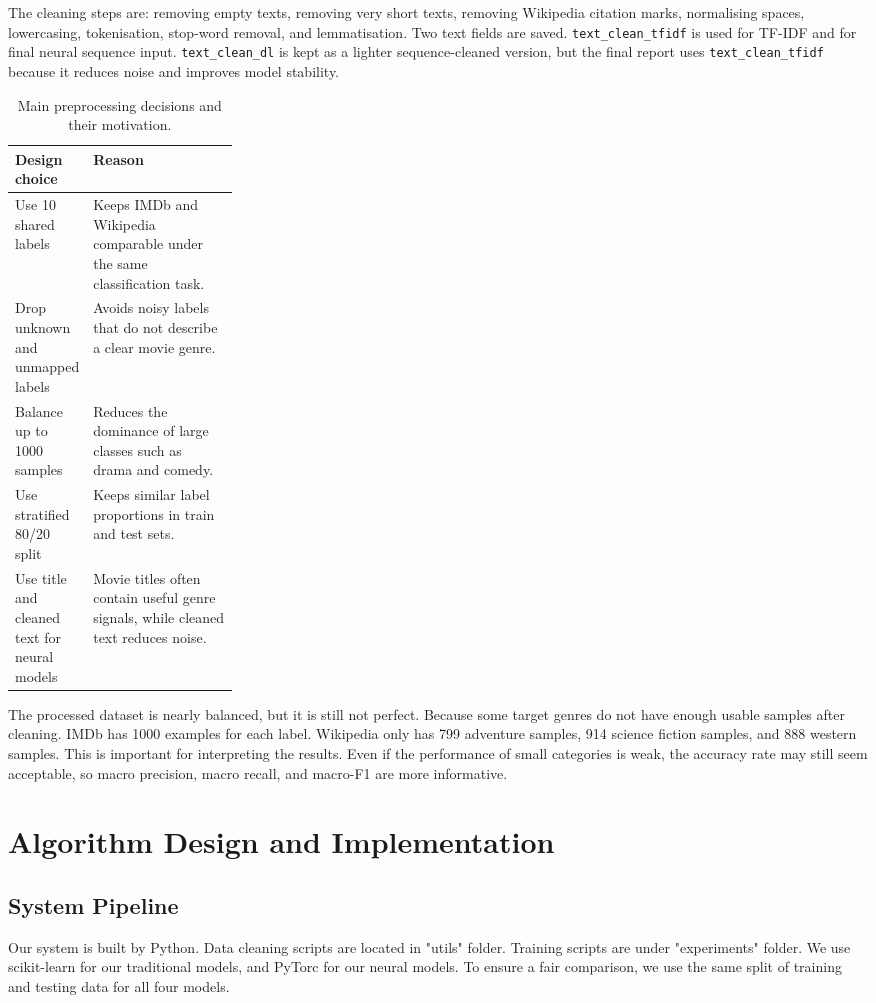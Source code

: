 \documentclass[12pt,a4paper]{article}
\begin{document}
The cleaning steps are: removing empty texts, removing very short texts, removing Wikipedia citation marks, normalising spaces, lowercasing, tokenisation, stop-word removal, and lemmatisation. Two text fields are saved. \texttt{text\_clean\_tfidf} is used for TF-IDF and for final neural sequence input. \texttt{text\_clean\_dl} is kept as a lighter sequence-cleaned version, but the final report uses \texttt{text\_clean\_tfidf} because it reduces noise and improves model stability.

\begin{table}[H]
\centering
\begin{tabularx}{\linewidth}{p{0.26\linewidth}X}
\toprule
\textbf{Design choice} & \textbf{Reason} \\
\midrule
Use 10 shared labels & Keeps IMDb and Wikipedia comparable under the same classification task. \\
Drop unknown and unmapped labels & Avoids noisy labels that do not describe a clear movie genre. \\
Balance up to 1000 samples & Reduces the dominance of large classes such as drama and comedy. \\
Use stratified 80/20 split & Keeps similar label proportions in train and test sets. \\
Use title and cleaned text for neural models & Movie titles often contain useful genre signals, while cleaned text reduces noise. \\
\bottomrule
\end{tabularx}
\caption{Main preprocessing decisions and their motivation.}
\label{tab:preprocess_choices}
\end{table}

The processed dataset is nearly balanced, but it is still not perfect. Because some target genres do not have enough usable samples after cleaning. IMDb has 1000 examples for each label. Wikipedia only has 799 adventure samples, 914 science fiction samples, and 888 western samples. This is important for interpreting the results. Even if the performance of small categories is weak, the accuracy rate may still seem acceptable, so macro precision, macro recall, and macro-F1 are more informative.

\section{Algorithm Design and Implementation}
\subsection{System Pipeline}
Our system is built by Python. Data cleaning scripts are located in "utils" folder. Training scripts are under "experiments" folder. We use scikit-learn \cite{sklearn_docs} for our traditional models, and PyTorc \cite{pytorch_docs} for our neural models. To ensure a fair comparison, we use the same split of training and testing data for all four models.
\end{document}
